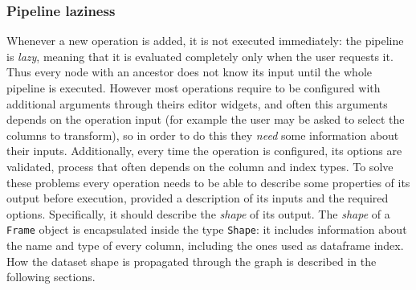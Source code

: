 \subsubsection{Pipeline laziness}
Whenever a new operation is added, it is not executed immediately: the pipeline is \textit{lazy}, meaning that it is evaluated completely only when the user requests it. Thus every node with an ancestor does not know its input until the whole pipeline is executed. However most operations require to be configured with additional arguments through theirs editor widgets, and often this arguments depends on the operation input (for example the user may be asked to select the columns to transform), so in order to do this they \textit{need} some information about their inputs. Additionally, every time the operation is configured, its options are validated, process that often depends on the column and index types. To solve these problems every operation needs to be able to describe some properties of its output before execution, provided a description of its inputs and the required options. Specifically, it should describe the \textit{shape} of its output. The \textit{shape} of a \texttt{Frame} object is encapsulated inside the type \texttt{Shape}: it includes information about the name and type of every column, including the ones used as dataframe index. How the dataset shape is propagated through the graph is described in the following sections.

